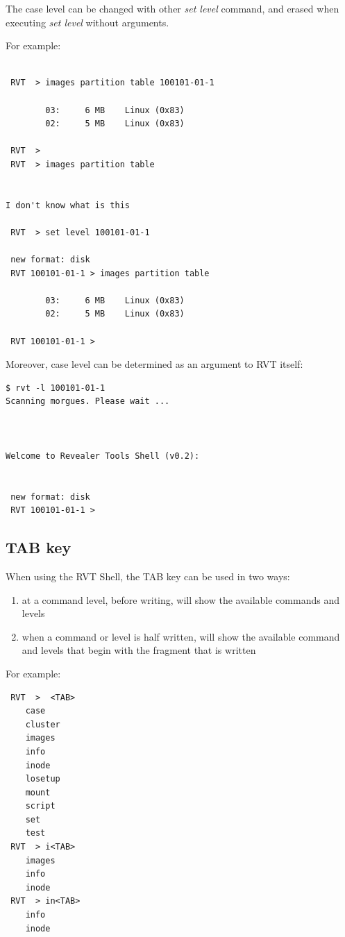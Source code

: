 \documentclass[a4paper,11pt,oneside]{report}
\begin{document}
The case level can be changed with other \emph{set level} command, and erased when executing \emph{set level} without arguments.

For example:

\begin{verbatim}

 RVT  > images partition table 100101-01-1                                    

        03:     6 MB    Linux (0x83)
        02:     5 MB    Linux (0x83)

 RVT  > 
 RVT  > images partition table


I don't know what is this

 RVT  > set level 100101-01-1                                                 

 new format: disk
 RVT 100101-01-1 > images partition table                                     

        03:     6 MB    Linux (0x83)
        02:     5 MB    Linux (0x83)

 RVT 100101-01-1 > 
\end{verbatim}


Moreover, case level can be determined as an argument to RVT itself:

\begin{verbatim}
$ rvt -l 100101-01-1
Scanning morgues. Please wait ...



Welcome to Revealer Tools Shell (v0.2):


 new format: disk
 RVT 100101-01-1 >  
\end{verbatim}



\subsection{TAB key}

When using the RVT Shell, the TAB key can be used in two ways:

\begin{enumerate}
\item at a command level, before writing, will show the available commands and levels
\item when a command or level is half written, will show the available command and levels that begin with the fragment that is written
\end{enumerate}

For example:

\begin{verbatim}
 RVT  >  <TAB>	
	case
	cluster
	images
	info
	inode
	losetup
	mount
	script
	set
	test
 RVT  > i<TAB>	
	images
	info
	inode
 RVT  > in<TAB>	
	info
	inode
\end{verbatim}
\end{document}
